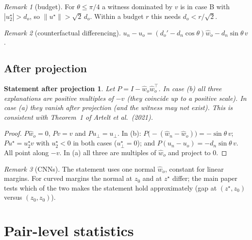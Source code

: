 \documentclass[10pt,a4paper]{article}
\newtheorem*{propproj}{Statement after projection}
\theoremstyle{remark}
\newtheorem*{remark}{Remark}
\newcommand{\hw}{\hat w}
\newcommand{\norm}[1]{\lVert #1\rVert}
\begin{document}
\begin{remark}[budget]
For $\theta\le\pi/4$ a witness dominated by $v$ is in case B with $|u_2^\star|>d_o$, so $\norm{u^\star}>\sqrt2\,d_o$. Within a budget $r$ this needs $d_o<r/\sqrt2$.
\end{remark}

\begin{remark}[counterfactual differencing]
$u_n-u_o=(d_o'-d_n\cos\theta)\hw_o-d_n\sin\theta\,v$.
\end{remark}

\subsection{After projection}

\begin{propproj}
Let $P=I-\hw_o\hw_o^\top$. In case (b) all three explanations are positive multiples of $-v$ (they coincide up to a positive scale). In case (a) they vanish after projection (and the witness may not exist). This is consistent with Theorem~1 of Artelt et al.\ (2021).
\end{propproj}
\begin{proof}
$P\hw_o=0$, $Pv=v$ and $Pu_\perp=u_\perp$. In (b): $P\bigl(-(\hw_n-\hw_o)\bigr)=-\sin\theta\,v$; $Pu^\star=u_2^\star v$ with $u_2^\star<0$ in both cases ($u_\perp^\star=0$); and $P(u_n-u_o)=-d_n\sin\theta\,v$. All point along $-v$. In (a) all three are multiples of $\hw_o$ and project to $0$.
\end{proof}

\begin{remark}[CNNs]
The statement uses one normal $\hw_o$, constant for linear margins. For curved margins the normal at $z_0$ and at $z^\star$ differ; the main paper tests which of the two makes the statement hold approximately (gap at $(z^\star,z_0)$ versus $(z_0,z_0)$).
\end{remark}

\section{Pair-level statistics}\label{sec:pair}
\end{document}
